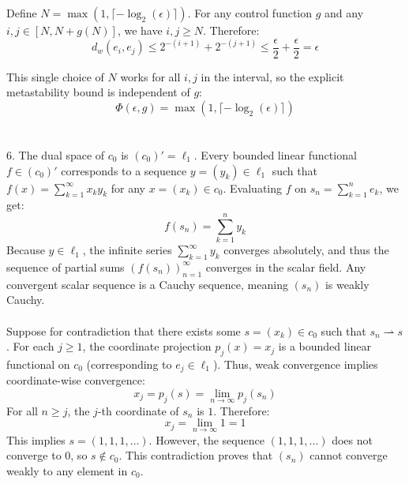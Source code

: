 \documentclass{article}
\begin{document}
Define $N = \max(1, \lceil -\log_2(\epsilon) \rceil)$. For any control function $g$ and any $i, j \in [N, N+g(N)]$, we have $i, j \ge N$. Therefore:
$$d_w(e_i, e_j) \le 2^{-(i+1)} + 2^{-(j+1)} \le \frac{\epsilon}{2} + \frac{\epsilon}{2} = \epsilon$$

This single choice of $N$ works for all $i, j$ in the interval, so the explicit metastability bound is independent of $g$:
$$\Phi(\epsilon, g) = \max(1, \lceil -\log_2(\epsilon) \rceil)$$
\\
\\
6. The dual space of $c_0$ is $(c_0)' = \ell_1$. Every bounded linear functional $f \in (c_0)'$ corresponds to a sequence $y = (y_k) \in \ell_1$ such that $f(x) = \sum_{k=1}^\infty x_k y_k$ for any $x = (x_k) \in c_0$. 
Evaluating $f$ on $s_n = \sum_{k=1}^n e_k$, we get:
$$f(s_n) = \sum_{k=1}^n y_k$$
Because $y \in \ell_1$, the infinite series $\sum_{k=1}^\infty y_k$ converges absolutely, and thus the sequence of partial sums $(f(s_n))_{n=1}^\infty$ converges in the scalar field. Any convergent scalar sequence is a Cauchy sequence, meaning $(s_n)$ is weakly Cauchy.
\\
\\
Suppose for contradiction that there exists some $s = (x_k) \in c_0$ such that $s_n \rightharpoonup s$. 
For each $j \ge 1$, the coordinate projection $p_j(x) = x_j$ is a bounded linear functional on $c_0$ (corresponding to $e_j \in \ell_1$). Thus, weak convergence implies coordinate-wise convergence:
$$x_j = p_j(s) = \lim_{n \to \infty} p_j(s_n)$$
For all $n \ge j$, the $j$-th coordinate of $s_n$ is $1$. Therefore:
$$x_j = \lim_{n \to \infty} 1 = 1$$
This implies $s = (1, 1, 1, \dots)$. However, the sequence $(1, 1, 1, \dots)$ does not converge to $0$, so $s \notin c_0$. This contradiction proves that $(s_n)$ cannot converge weakly to any element in $c_0$.
\end{document}
